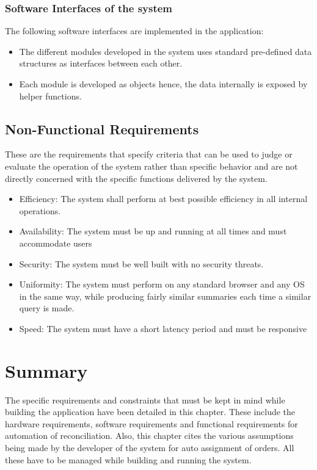         \subsubsection{Software Interfaces of the system}
        The following software interfaces are implemented in the application:
        \begin{itemize}
            \item The different modules developed in the system uses standard pre-defined data structures as interfaces between each other.
            \item Each module is developed as objects hence, the data internally is exposed by helper functions.
        \end{itemize}


    \subsection{Non-Functional Requirements}
    These are the requirements that specify criteria that can be used to judge or evaluate the operation of the system rather than specific behavior and are not directly concerned with the specific functions delivered by the system.

    \begin{itemize}
        \item Efficiency: The system shall perform at best possible efficiency in all internal operations.
        \item Availability: The system must be up and running at all times and must accommodate users
        \item Security: The system must be well built with no security threats.
        \item Uniformity: The system must perform on any standard browser and any OS in the same way, while producing fairly similar summaries each time a similar query is made.
        \item Speed: The system must have a short latency period and must be responsive
    \end{itemize}

\section{Summary}

The specific requirements and constraints that must be kept in mind while building the application have been detailed in this chapter. These include the hardware requirements, software requirements and functional requirements for automation of reconciliation. Also, this chapter cites the various assumptions being made by the developer of the system for auto assignment of orders.  All these have to be managed while building and running the system.